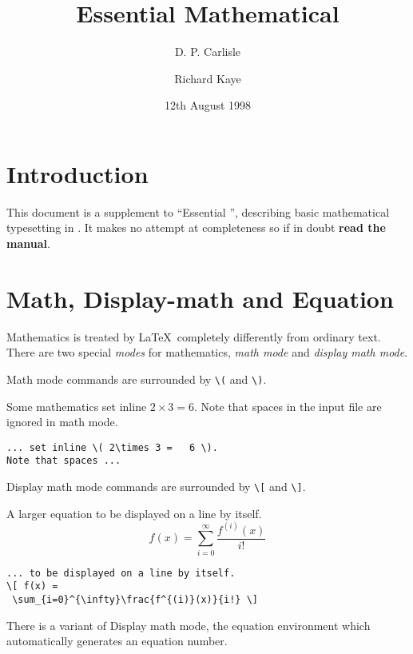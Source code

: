 \documentclass[a4paper]{article}
\title{Essential Mathematical \LaTeXe}
\author{D. P. Carlisle \and Richard Kaye}
\date{12th August 1998}
\newlength{\egwidth}\setlength{\egwidth}{0.45\textwidth}
\newenvironment{eg}%
{\begin{list}{}{\setlength{\leftmargin}{0pt}%
\setlength{\rightmargin}{\leftmargin}}\item[]\footnotesize}%
{\end{list}}
\newenvironment{egbox}%
{\begin{minipage}[t]{\egwidth}}%
{\end{minipage}}
\newcommand{\egstart}{\begin{eg}\begin{egbox}}
\newcommand{\egmid}{\end{egbox}\hfill\begin{egbox}}
\newcommand{\egend}{\end{egbox}\end{eg}}
\begin{document}
\maketitle

\section{Introduction}
This document is a supplement to ``Essential \LaTeXe'', describing
basic mathematical typesetting in \LaTeXe. It makes no attempt at 
completeness so if in doubt {\bf read the manual}.

\section{Math, Display-math and Equation}
Mathematics is treated by \LaTeX\  completely differently from ordinary text.
There are two special {\em modes\/} for mathematics, {\em math mode\/}
and {\em display math mode}.

Math mode commands are surrounded by \verb|\(| and \verb|\)|.
\egstart
Some mathematics set inline \( 2\times 3 =   6 \).
Note that spaces in the input file are ignored in math mode.
\egmid
\begin{verbatim}
... set inline \( 2\times 3 =   6 \).
Note that spaces ...
\end{verbatim}
\egend

Display math mode commands are surrounded by \verb|\[| and \verb|\]|.
\egstart
A larger equation to be displayed on a line by itself.
\[ f(x) = \sum_{i=0}^{\infty}\frac{f^{(i)}(x)}{i!} \]
\egmid
\begin{verbatim}
... to be displayed on a line by itself.
\[ f(x) = 
 \sum_{i=0}^{\infty}\frac{f^{(i)}(x)}{i!} \]
\end{verbatim}
\egend

There is a variant of Display math mode, the equation environment
which automatically generates an equation number.
\end{document}
